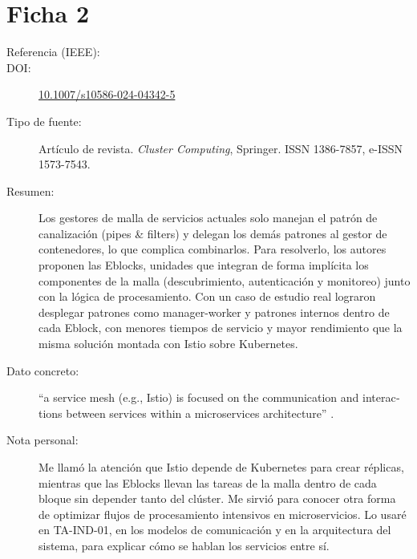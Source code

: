 \documentclass[11pt,a4paper]{article}
\newcommand{\doi}[1]{\href{https://doi.org/#1}{#1}}
\begin{document}
\section{Ficha 2}
\begin{description}
  \item[Referencia (IEEE):] 
  \item[DOI:] \doi{10.1007/s10586-024-04342-5}
  \item[Tipo de fuente:] Artículo de revista. \emph{Cluster Computing}, Springer. ISSN 1386-7857, e-ISSN 1573-7543.
  \item[Resumen:] Los gestores de malla de servicios actuales solo manejan el patrón de canalización (pipes \& filters) y delegan los demás patrones al gestor de contenedores, lo que complica combinarlos. Para resolverlo, los autores proponen las Eblocks, unidades que integran de forma implícita los componentes de la malla (descubrimiento, autenticación y monitoreo) junto con la lógica de procesamiento. Con un caso de estudio real lograron desplegar patrones como manager-worker y patrones internos dentro de cada Eblock, con menores tiempos de servicio y mayor rendimiento que la misma solución montada con Istio sobre Kubernetes.
  \item[Dato concreto:] \foreignquote{american}{a service mesh (e.g., Istio) is focused on the communication and interactions between services within a microservices architecture} \cite[Sec.~6, p.~7431]{nicolasplata2024}.
  \item[Nota personal:] Me llamó la atención que Istio depende de Kubernetes para crear réplicas, mientras que las Eblocks llevan las tareas de la malla dentro de cada bloque sin depender tanto del clúster. Me sirvió para conocer otra forma de optimizar flujos de procesamiento intensivos en microservicios. Lo usaré en TA-IND-01, en los modelos de comunicación y en la arquitectura del sistema, para explicar cómo se hablan los servicios entre sí.
\end{description}
\end{document}
